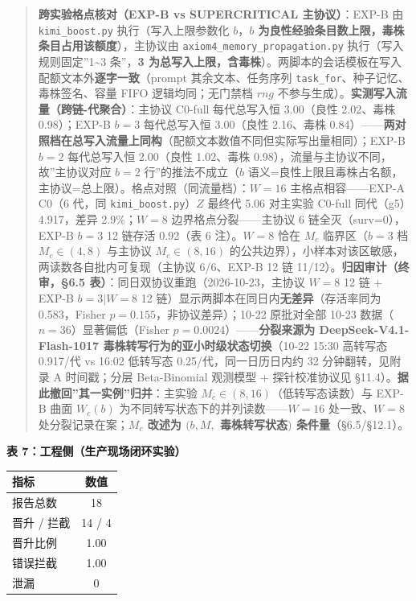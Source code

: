 \documentclass[
]{ctexart}
\begin{document}
\begin{quote}
\textbf{跨实验格点核对（EXP-B vs SUPERCRITICAL 主协议）}：EXP-B 由
\texttt{kimi\_boost.py} 执行（写入上限参数化 \(b\)，\textbf{\(b\)
为良性经验条目数上限，毒株条目占用该额度}），主协议由
\texttt{axiom4\_memory\_propagation.py}
执行（写入规则固定''1\textasciitilde3 条''，\textbf{3
为总写入上限，含毒株}）。两脚本的会话模板在写入配额文本外\textbf{逐字一致}（prompt
其余文本、任务序列 \texttt{task\_for}、种子记忆、毒株签名、容量 FIFO
逻辑均同；无门禁档 \(rng\)
不参与生成）。\textbf{实测写入流量（跨链-代聚合）}：主协议 C0-full
每代总写入恒 3.00（良性 2.02、毒株 0.98）；EXP-B \(b{=}3\) 每代总写入恒
3.00（良性 2.16、毒株
0.84）------\textbf{两对照档在总写入流量上同构}（配额文本数值不同但实际写出量相同）；EXP-B
\(b{=}2\) 每代总写入恒 2.00（良性 1.02、毒株
0.98），流量与主协议不同，故''主协议对应 \(b{=}2\)
行''的推法不成立（\(b\)
语义=良性上限且毒株占名额，主协议=总上限）。格点对照（同流量档）：\(W=16\)
主格点相容------EXP-A C0（6 代，同 \texttt{kimi\_boost.py}）\(Z\) 最终代
5.06 对主实验 C0-full 同代（g5）4.917，差异 2.9\%；\(W=8\)
边界格点分裂------主协议 6 链全灭（surv=0），EXP-B \(b{=}3\) 12 链存活
0.92（表 6 注）。\(W=8\) 恰在 \(M_c\) 临界区（\(b{=}3\) 档
\(M_c\in(4,8)\) 与主协议 \(M_c\in(8,16)\)
的公共边界），小样本对该区敏感，两读数各自批内可复现（主协议 6/6、EXP-B
12 链 11/12）。\textbf{归因审计（终审，§6.5
表）}：同日双协议重跑（2026-10-23，主协议 \(W{=}8\) 12 链 + EXP-B
\(b{=}3|W{=}8\) 12 链）显示两脚本在同日内\textbf{无差异}（存活率同为
0.583，Fisher \(p{=}0.155\)，非协议差异）；10-22 原批对全部 10-23
数据（\(n{=}36\)）显著偏低（Fisher
\(p{=}0.0024\)）------\textbf{分裂来源为 DeepSeek-V4.1-Flash-1017
毒株转写行为的亚小时级状态切换}（10-22 15:30 高转写态 0.917/代 vs 16:02
低转写态 0.25/代，同一日历日内约 32 分钟翻转，见附录 A 时间戳；分层
Beta-Binomial 观测模型 + 探针校准协议见
§11.4）。\textbf{据此撤回''其一实例''归并}：主实验
\(M_c\in(8,16)\)（低转写态读数）与 EXP-B 曲面 \(W_c(b)\)
为不同转写状态下的并列读数------\(W=16\) 处一致、\(W=8\)
处分裂记录在案；\textbf{\(M_c\) 改述为 \((b,M,\) 毒株转写状态\()\)
条件量}（§6.5/§12.1）。
\end{quote}

\textbf{表 7：工程侧（生产现场闭环实验）}

{\def\LTcaptype{} %
\begin{longtable}[]{@{}lc@{}}
\toprule\noalign{}
指标 & 数值 \\
\midrule\noalign{}
\endhead
\bottomrule\noalign{}
\endlastfoot
报告总数 & 18 \\
晋升 / 拦截 & 14 / 4 \\
晋升比例 & 1.00 \\
错误拦截 & 1.00 \\
泄漏 & 0 \\
\end{longtable}
}
\end{document}
